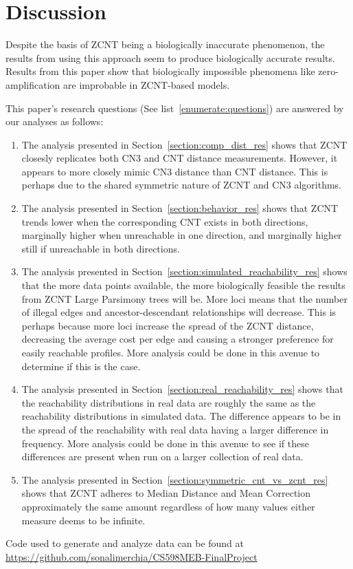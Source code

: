 \section{Discussion}

Despite the basis of ZCNT being a biologically inaccurate phenomenon, the results from using this approach seem to produce biologically accurate results. Results from this paper show that biologically impossible phenomena like zero-amplification are improbable in ZCNT-based models. 

This paper's research questions (See list~\ref{enumerate:questions}) are answered by our analyses as follows:

\begin{enumerate}
    \item The analysis presented in Section~\ref{section:comp_dist_res} shows that ZCNT closesly replicates both CN3 and CNT distance measurements. However, it appears to more closely mimic CN3 distance than CNT distance. This is perhaps due to the shared symmetric nature of ZCNT and CN3 algorithms. 
    \item The analysis presented in Section~\ref{section:behavior_res} shows that ZCNT trends lower when the corresponding CNT exists in both directions, marginally higher when unreachable in one direction, and marginally higher still if unreachable in both directions. 
    \item The analysis presented in Section~\ref{section:simulated_reachability_res} shows that the more data points available, the more biologically feasible the results from ZCNT Large Parsimony trees will be. More loci means that the number of illegal edges and ancestor-descendant relationships will decrease. This is perhaps because more loci increase the spread of the ZCNT distance, decreasing the average cost per edge and causing a stronger preference for easily reachable profiles. More analysis could be done in this avenue to determine if this is the case. 
    \item The analysis presented in Section~\ref{section:real_reachability_res} shows that the reachability distributions in real data are roughly the same as the reachability distributions in simulated data. The difference appears to be in the spread of the reachability with real data having a larger difference in frequency. More analysis could be done in this avenue to see if these differences are present when run on a larger collection of real data. 
    \item The analysis presented in Section~\ref{section:symmetric_cnt_vs_zcnt_res} shows that ZCNT adheres to Median Distance and Mean Correction approximately the same amount regardless of how many values either measure deems to be infinite. 
\end{enumerate}

Code used to generate and analyze data can be found at \href{https://github.com/sonalimerchia/CS598MEB-FinalProject}{https://github.com/sonalimerchia/CS598MEB-FinalProject}
